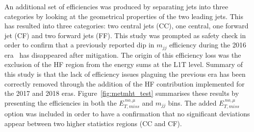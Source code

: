 \hspace{10pt} An additional set of efficiencies was produced by separating jets into three categories by looking at the geometrical properties of the two leading jets. This has resulted into three categories: two central jets (CC), one central, one forward jet (CF) and two forward jets (FF). This study was prompted as safety check in order to confirm that a previously reported dip in $m_{jj}$ efficiency during the 2016 era~\cite{note:AN_16_418} has disappeared after mitigation. The origin of this efficiency loss was the exclusion of the HF region from the energy sums at the L1T level. Summary of this study is that the lack of efficiency issues plaguing the previous era has been correctly removed through the addition of the HF contribution implemented for the 2017 and 2018 eras. Figure~\ref{fig:metmht_test} summarises these results by presenting the efficiencies in both the $E_{T,miss}^{~no,\mu}$ and $m_{jj}$ bins. The added $E_{T,miss}^{~no,\mu}$ option was included in order to have a confirmation that no significant deviations appear between two higher statistics regions (CC and CF).


